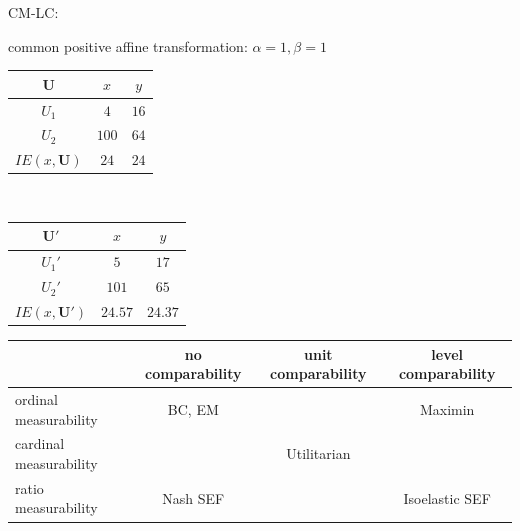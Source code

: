 \documentclass[a4paper]{article}
\begin{document}
CM-LC:

common positive affine transformation: $\alpha=1, \beta=1$
\begin{table}[!htbp]
    \centering
    \begin{tabular}{c|cc|}
        $\mathbf{U}$ & $x$ & $y$              \\ 
        \hline
        $U_1$        & $4$ & $16$ \\
        $U_2$        & $100$ & $64$ \\
        \hline
        $IE(x,\mathbf{U})$ & $24$ & $24$ \\
    \end{tabular}
    $\qquad\qquad$
    \begin{tabular}{c|cc|}
        $\mathbf{U'}$ & $x$ & $y$              \\ 
        \hline
        $U_1'$        & $5$ & $17$ \\
        $U_2'$        & $101$ & $65$ \\
        \hline
        $IE(x,\mathbf{U}')$ & $24.57$ & $24.37$ \\
    \end{tabular}
\end{table}

\begin{table}[!htbp]
    \centering
    \begin{tabular}{l|c|c|c|}
                               & no comparability & unit comparability & level comparability \\ 
        \hline
        ordinal measurability  & BC, EM           &                    & Maximin             \\
        \hline
        cardinal measurability &                  & Utilitarian        &                     \\
        \hline
        ratio measurability    & Nash SEF         &                    & Isoelastic SEF      \\
        \hline
    \end{tabular}
\end{table}
\end{document}
